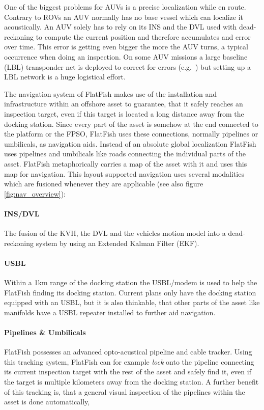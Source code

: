 \documentclass[conference]{IEEEtran}
\begin{document}
One of the biggest problems for AUVs is a precise localization while en route. Contrary to 
ROVs an AUV normally has no base vessel which can localize it acoustically. An AUV solely 
has to rely on its INS and the DVL used with dead-reckoning to compute the current 
position and therefore accumulates and error over time. This error is getting even bigger the 
more the AUV turns, a typical occurrence when doing an inspection. On some AUV missions 
a large baseline (LBL) transponder net is deployed to correct for errors 
(e.g.~\cite{purcell2011}) but setting up a LBL network is a huge logistical effort.

The navigation system of FlatFish makes use of the installation and infrastructure within an 
offshore asset to guarantee, that it safely reaches an inspection target, even if this target is 
located a long distance away from the docking station. Since every part of the asset is 
somehow at the end connected to the platform or the FPSO, FlatFish uses these 
connections, normally pipelines or umbilicals, as navigation aids. Instead of an absolute 
global localization FlatFish uses pipelines and umbilicals like roads connecting the individual 
parts of the asset. FlatFish metaphorically carries a map of the asset with it and uses this 
map for navigation. This layout supported navigation uses several modalities which are 
fusioned whenever they are applicable (see also figure \ref{fig:nav_overview}):
\paragraph*{\textbf{INS/DVL}} The fusion of the KVH, the DVL and the vehicles motion 
model into  a dead-reckoning system by using an Extended Kalman Filter (EKF).
\paragraph*{\textbf{USBL}} Within a 1km range of the docking station the USBL/modem is 
used to help the FlatFish finding its docking station. Current plans only have the docking 
station equipped with an USBL, but it is also thinkable, that other parts of the asset like 
manifolds have a USBL repeater installed to further aid navigation.
\paragraph*{\textbf{Pipelines \& Umbilicals}} FlatFish possesses an advanced 
opto-acustical pipeline and cable tracker. Using this tracking system, FlatFish can for 
example \textit{lock} onto the pipeline connecting its current inspection target with the rest 
of the asset and safely find it, even if the target is multiple kilometers away from the docking 
station. A further benefit of this tracking is, that a general visual inspection of the pipelines 
within the asset is done automatically,
\end{document}

